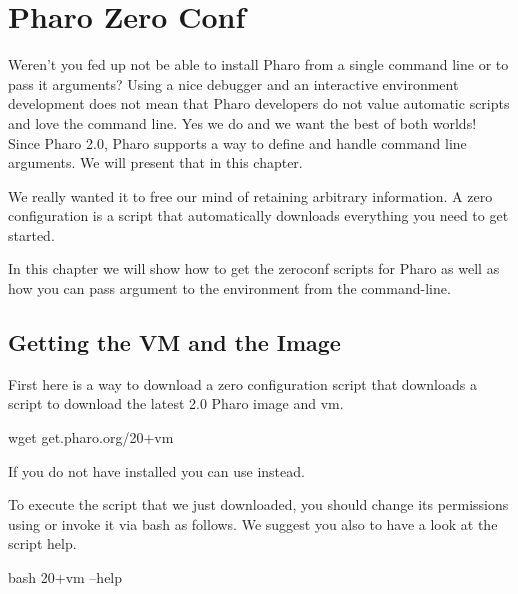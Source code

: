\documentclass[a4paper,10pt,twoside]{book}
\begin{document}
\fi
\sloppy

\chapter{Pharo Zero Conf}


Weren't you fed up not be able to install Pharo from a single command line or to pass it arguments? 
Using a nice debugger and an interactive environment development does not 
mean that Pharo developers do not value automatic scripts and love the command line.
Yes we do and we want the best of both worlds!
Since Pharo 2.0, Pharo supports a way to define and handle command line arguments. 
We will present that in this chapter. 

We really wanted it to free our mind of retaining arbitrary information. 
A zero configuration is a script that automatically downloads everything you need to get started. 

In this chapter we will show how to get the zeroconf scripts for Pharo as well as how you can pass argument to the environment from the command-line.



\section{Getting the VM and the Image}
First here is a way to download a zero configuration script that downloads a script to download the latest 2.0 Pharo image and vm. 

\begin{code}{}
wget get.pharo.org/20+vm
\end{code}

If you do not have  installed you can use  instead.

To execute the script that we just downloaded, you should change its permissions using   or invoke it via bash as follows. 
We suggest you also to have a look at the script help.

\begin{code}{}
bash 20+vm --help 
\end{code}
\end{document}
